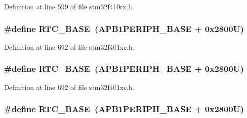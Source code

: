 Definition at line 599 of file stm32f410rx.\+h.

\subsubsection[{\texorpdfstring{R\+T\+C\+\_\+\+B\+A\+SE}{RTC_BASE}}]{\setlength{\rightskip}{0pt plus 5cm}\#define R\+T\+C\+\_\+\+B\+A\+SE~({\bf A\+P\+B1\+P\+E\+R\+I\+P\+H\+\_\+\+B\+A\+SE} + 0x2800\+U)}\hypertarget{group___peripheral__registers__structures_ga4265e665d56225412e57a61d87417022}{}\label{group___peripheral__registers__structures_ga4265e665d56225412e57a61d87417022}


Definition at line 692 of file stm32f401xc.\+h.

\subsubsection[{\texorpdfstring{R\+T\+C\+\_\+\+B\+A\+SE}{RTC_BASE}}]{\setlength{\rightskip}{0pt plus 5cm}\#define R\+T\+C\+\_\+\+B\+A\+SE~({\bf A\+P\+B1\+P\+E\+R\+I\+P\+H\+\_\+\+B\+A\+SE} + 0x2800\+U)}\hypertarget{group___peripheral__registers__structures_ga4265e665d56225412e57a61d87417022}{}\label{group___peripheral__registers__structures_ga4265e665d56225412e57a61d87417022}


Definition at line 692 of file stm32f401xe.\+h.

\subsubsection[{\texorpdfstring{R\+T\+C\+\_\+\+B\+A\+SE}{RTC_BASE}}]{\setlength{\rightskip}{0pt plus 5cm}\#define R\+T\+C\+\_\+\+B\+A\+SE~({\bf A\+P\+B1\+P\+E\+R\+I\+P\+H\+\_\+\+B\+A\+SE} + 0x2800\+U)}\hypertarget{group___peripheral__registers__structures_ga4265e665d56225412e57a61d87417022}{}\label{group___peripheral__registers__structures_ga4265e665d56225412e57a61d87417022}


